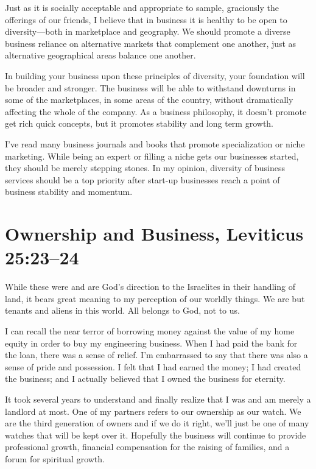 \documentclass[12pt]{memoir}
\begin{document}
Just as it is socially acceptable and appropriate to sample, graciously the offerings of our friends, I believe that in business it is healthy to be open to diversity---both in marketplace and geography. We should promote a diverse business reliance on alternative markets that complement one another, just as alternative geographical
areas balance one another.

In building your business upon these principles
of diversity, your foundation will be broader and stronger. The business
will be able to withstand downturns in some of the marketplaces, in
some areas of the country, without dramatically affecting the whole
of the company. As a business philosophy, it doesn't promote get rich quick concepts, but it promotes stability and long term growth.

I've read many business journals and books that promote specialization or niche marketing. While being an expert or filling a niche gets our businesses
started, they should be merely stepping stones. In my opinion, diversity
of business services should be a top priority after start-up businesses reach a point of business stability and momentum.

\section[Ownership and Business]{Ownership and Business, Leviticus 25:23--24}

While these were and are God's direction to the Israelites in their
handling of land, it bears great meaning to my perception of our worldly
things. We are but tenants and aliens in this world.
All belongs to God, not to us. 

I can recall the near terror of borrowing money against the value
of my home equity in order to buy my engineering business. When I had paid
the bank for the loan, there was a sense of relief. I'm embarrassed
to say that there was also a sense of pride and possession. I felt
that I had earned the money; I had created the business; and I actually
believed that I owned the business for eternity.

It took several years
to understand and finally realize that I was and am merely a landlord
at most. One of my partners refers to our ownership as our watch. We are the third generation of owners and if we do it right, we'll
just be one of many watches that will be kept over it. Hopefully the business will continue
to provide professional growth, financial compensation for the raising
of families, and a forum for spiritual growth. 
\end{document}
